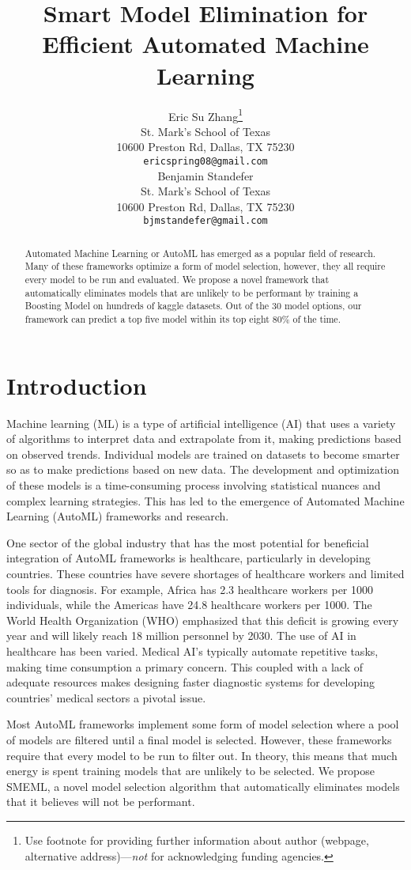 \documentclass{article}
\title{Smart Model Elimination for Efficient Automated Machine Learning}
\author{%
  Eric Su Zhang\thanks{Use footnote for providing further information
    about author (webpage, alternative address)---\emph{not} for acknowledging
    funding agencies.} \\
  St. Mark's School of Texas\\
  10600 Preston Rd, Dallas, TX 75230\\
  \texttt{ericspring08@gmail.com} \\
  \And
  Benjamin Standefer \\
  St. Mark's School of Texas \\
  10600 Preston Rd, Dallas, TX 75230 \\
  \texttt{bjmstandefer@gmail.com} \\
}
\begin{document}
\maketitle


\begin{abstract}
  Automated Machine Learning or AutoML has emerged as a popular field of research. Many of these frameworks optimize a form of model selection, however, they all require every model to be run and evaluated. We propose a novel framework that automatically eliminates models that are unlikely to be performant by training a Boosting Model on hundreds of kaggle datasets. Out of the 30 model options, our framework can predict a top five model within its top eight 80\% of the time.
\end{abstract}


\section{Introduction}

Machine learning (ML) is a type of artificial intelligence (AI) that uses a variety of algorithms to interpret data and extrapolate from it, making predictions based on observed trends. Individual models are trained on datasets to become smarter so as to make predictions based on new data. The development and optimization of these models is a time-consuming process involving statistical nuances and complex learning strategies. This has led to the emergence of Automated Machine Learning (AutoML) frameworks and research. 

One sector of the global industry that has the most potential for beneficial integration of AutoML frameworks is healthcare, particularly in developing countries. These countries have severe shortages of healthcare workers and limited tools for diagnosis. For example, Africa has 2.3 healthcare workers per 1000 individuals, while the Americas have 24.8 healthcare workers per 1000. The World Health Organization (WHO) emphasized that this deficit is growing every year and will likely reach 18 million personnel by 2030. The use of AI in healthcare has been varied. Medical AI's typically automate repetitive tasks, making time consumption a primary concern. This coupled with a lack of adequate resources makes designing faster diagnostic systems for developing countries' medical sectors a pivotal issue. 

Most AutoML frameworks implement some form of model selection where a pool of models are filtered until a final model is selected. However, these frameworks require that every model to be run to filter out. In theory, this means that much energy is spent training models that are unlikely to be selected. We propose SMEML, a novel model selection algorithm that automatically eliminates models that it believes will not be performant. 
\end{document}
